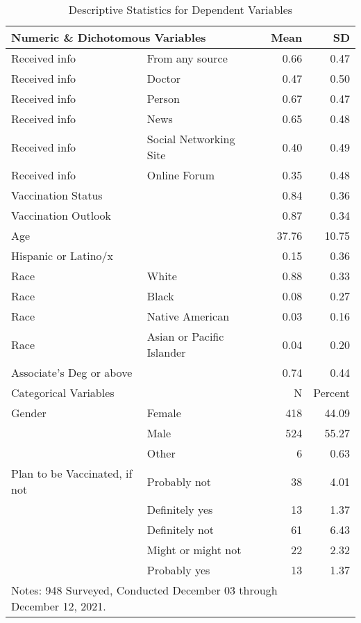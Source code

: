 \begin{table}[!ht]

\caption{\label{tab:table-2-dep}Descriptive Statistics for Dependent Variables}
\centering
\fontsize{10}{12}\selectfont
\begin{tabular}{llrr}
\toprule
\multicolumn{2}{l}{Numeric \& Dichotomous Variables} & Mean & SD\\
\midrule
Received info & From any source & \num{0.66} & \num{0.47}\\
Received info & Doctor & \num{0.47} & \num{0.50}\\
Received info & Person & \num{0.67} & \num{0.47}\\
Received info & News & \num{0.65} & \num{0.48}\\
Received info & Social Networking Site & \num{0.40} & \num{0.49}\\
Received info & Online Forum & \num{0.35} & \num{0.48}\\
Vaccination Status &  &  \num{0.84} & \num{0.36}\\
Vaccination Outlook &  &  \num{0.87} & \num{0.34}\\
Age &  & \num{37.76} & \num{10.75}\\
Hispanic or Latino/x &  & \num{0.15} & \num{0.36}\\
Race & White & \num{0.88} & \num{0.33}\\
Race & Black & \num{0.08} & \num{0.27}\\
Race & Native American & \num{0.03} & \num{0.16}\\
Race & Asian or Pacific Islander & \num{0.04} & \num{0.20}\\
Associate's Deg or above &  & \num{0.74} & \num{0.44}\\\toprule
\multicolumn{2}{l}{Categorical Variables}  &  N & Percent\\\midrule
Gender & Female & 418 & \num{44.09}\\
 & Male & 524 & \num{55.27}\\
 & Other & 6 & \num{0.63}\\
Plan to be Vaccinated, if not & Probably not & 38 & \num{4.01}\\
 & Definitely yes & 13 & \num{1.37}\\
 & Definitely not & 61 & \num{6.43}\\
 & Might or might not & 22 & \num{2.32}\\
 & Probably yes & 13 & \num{1.37}\\
\bottomrule
\multicolumn{3}{l}{\rule{0pt}{1em}Notes: 948 Surveyed, Conducted December 03 through December 12, 2021.}\\
\end{tabular}
\end{table}